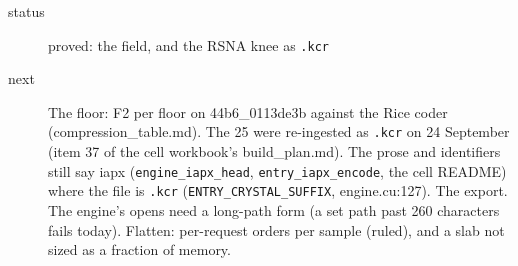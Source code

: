 \begin{description}
\item[{status}] proved: the field, and the RSNA knee as \texttt{.\allowbreak{}kcr}
\item[{next}] The floor: F2 per floor on 44b6\_\allowbreak{}0113de3b against the Rice coder (compression\_\allowbreak{}table.md). The 25 were re-ingested as \texttt{.\allowbreak{}kcr} on 24 September (item 37 of the cell workbook's build\_\allowbreak{}plan.md). The prose and identifiers still say iapx (\texttt{engine\_\allowbreak{}iapx\_\allowbreak{}head}, \texttt{entry\_\allowbreak{}iapx\_\allowbreak{}encode}, the cell README) where the file is \texttt{.\allowbreak{}kcr} (\texttt{ENTRY\_\allowbreak{}CRYSTAL\_\allowbreak{}SUFFIX}, engine.cu:127). The export. The engine's opens need a long-path form (a set path past 260 characters fails today). Flatten: per-request orders per sample (ruled), and a slab not sized as a fraction of memory.
\end{description}

